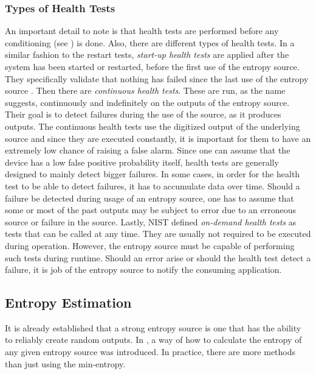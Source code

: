 \subsubsection{Types of Health Tests}
An important detail to note is that health tests are performed before any conditioning (see ) is done.
Also, there are different types of health tests. In a similar fashion to the restart tests, \emph{start-up health tests} are applied after the system has been started or restarted, before the first use of the entropy source.
They specifically validate that nothing has failed since the last use of the entropy source .
\newline
Then there are \emph{continuous health tests}. These are run, as the name suggests, continuously and indefinitely on the outputs of the entropy source. Their goal is to detect failures during the use of the source, as it produces outputs.
The continuous health tests use the digitized output of the underlying source and since they are executed constantly, it is important for them to have an extremely low chance of raising a false alarm.
Since one can assume that the device has a low false positive probability itself, health tests are generally designed to mainly detect bigger failures.
\newline
In some cases, in order for the health test to be able to detect failures, it has to accumulate data over time.
Should a failure be detected during usage of an entropy source, one has to assume that some or most of the past outputs may be subject to error due to an erroneous source or failure in the source.
\newline
Lastly, NIST defined \emph{on-demand health tests} as tests that can be called at any time.
They are usually not required to be executed during operation. However, the entropy source must be capable of performing such tests during runtime.
\emptyline
Should an error arise or should the health test detect a failure, it is job of the entropy source to notify the consuming application.

\subsection{Entropy Estimation}
It is already established that a strong entropy source is one that has the ability to reliably create random outputs.
In , a way of how to calculate the entropy of any given entropy source was introduced.
In practice, there are more methods than just using the min-entropy.


